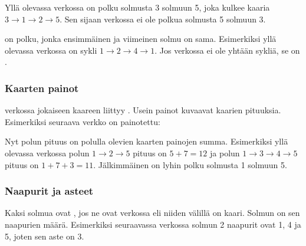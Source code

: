 Yllä olevassa verkossa on polku solmusta
3 solmuun 5, joka kulkee kaaria
$3 \rightarrow 1 \rightarrow 2 \rightarrow 5$.
Sen sijaan verkossa ei ole polkua
solmusta 5 solmuun 3.



 on polku, jonka ensimmäinen
ja viimeinen solmu on sama.
Esimerkiksi yllä olevassa verkossa on sykli
$1 \rightarrow 2 \rightarrow 4 \rightarrow 1$.
Jos verkossa ei ole yhtään sykliä, se on .

\subsubsection{Kaarten painot}


 verkossa
jokaiseen kaareen liittyy .
Usein painot kuvaavat kaarien pituuksia.
Esimerkiksi seuraava verkko on painotettu:
\begin{center}
\end{center}

Nyt polun pituus on 
polulla olevien kaarten painojen summa.
Esimerkiksi yllä olevassa verkossa
polun $1 \rightarrow 2 \rightarrow 5$
pituus on $5+7=12$ ja polun
$1 \rightarrow 3 \rightarrow 4 \rightarrow 5$ pituus on $1+7+3=11$.
Jälkimmäinen on lyhin polku solmusta 1 solmuun 5.

\subsubsection{Naapurit ja asteet}


Kaksi solmua ovat ,
jos ne ovat verkossa
 eli niiden välillä on kaari.
Solmun  on
sen naapurien määrä.
Esimerkiksi seuraavassa verkossa
solmun 2 naapurit ovat 1, 4 ja 5,
joten sen aste on 3.

